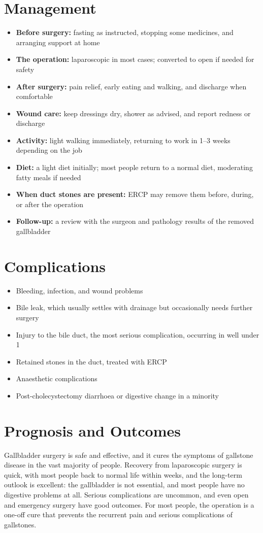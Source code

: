\section*{Management}
\begin{itemize}
    \item \textbf{Before surgery:} fasting as instructed, stopping some medicines, and arranging support at home
    \item \textbf{The operation:} laparoscopic in most cases; converted to open if needed for safety
    \item \textbf{After surgery:} pain relief, early eating and walking, and discharge when comfortable
    \item \textbf{Wound care:} keep dressings dry, shower as advised, and report redness or discharge
    \item \textbf{Activity:} light walking immediately, returning to work in 1--3 weeks depending on the job
    \item \textbf{Diet:} a light diet initially; most people return to a normal diet, moderating fatty meals if needed
    \item \textbf{When duct stones are present:} ERCP may remove them before, during, or after the operation
    \item \textbf{Follow-up:} a review with the surgeon and pathology results of the removed gallbladder
\end{itemize}

\section*{Complications}
\begin{itemize}
    \item Bleeding, infection, and wound problems
    \item Bile leak, which usually settles with drainage but occasionally needs further surgery
    \item Injury to the bile duct, the most serious complication, occurring in well under 1%
    \item Retained stones in the duct, treated with ERCP
    \item Anaesthetic complications
    \item Post-cholecystectomy diarrhoea or digestive change in a minority
\end{itemize}

\section*{Prognosis and Outcomes}
Gallbladder surgery is safe and effective, and it cures the symptoms of gallstone disease in the vast majority of people. Recovery from laparoscopic surgery is quick, with most people back to normal life within weeks, and the long-term outlook is excellent: the gallbladder is not essential, and most people have no digestive problems at all. Serious complications are uncommon, and even open and emergency surgery have good outcomes. For most people, the operation is a one-off cure that prevents the recurrent pain and serious complications of gallstones.

